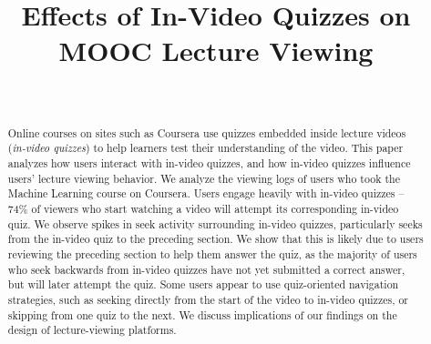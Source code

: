 \documentclass{sigchi}
\begin{document}
\title{Effects of In-Video Quizzes on MOOC Lecture Viewing}

\author{%
  \\
}

\maketitle

\begin{abstract}

Online courses on sites such as Coursera use quizzes embedded inside lecture videos (\textit{in-video quizzes}) to help learners test their understanding of the video. This paper analyzes how users interact with in-video quizzes, and how in-video quizzes influence users' lecture viewing behavior. We analyze the viewing logs of users who took the Machine Learning course on Coursera. Users engage heavily with in-video quizzes -- 74\% of viewers who start watching a video will attempt its corresponding in-video quiz. We observe spikes in seek activity surrounding in-video quizzes, particularly seeks from the in-video quiz to the preceding section. We show that this is likely due to users reviewing the preceding section to help them answer the quiz, as the majority of users who seek backwards from in-video quizzes have not yet submitted a correct answer, but will later attempt the quiz. Some users appear to use quiz-oriented navigation strategies, such as seeking directly from the start of the video to in-video quizzes, or skipping from one quiz to the next. We discuss implications of our findings on the design of lecture-viewing platforms.



\end{abstract}
\end{document}
